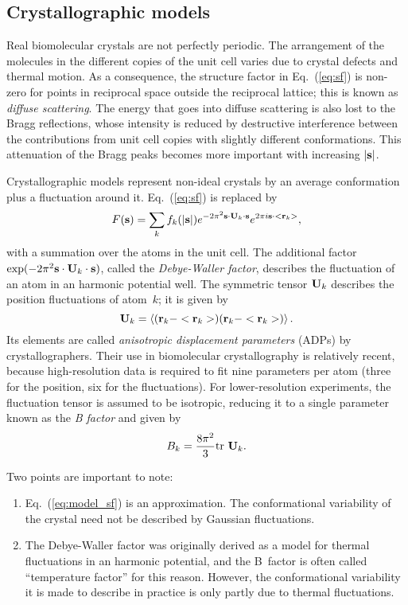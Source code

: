 \documentclass[12pt]{article}
\newcommand{\vect}[1]{{\bf #1}}
\newcommand{\mat}[1]{{\bf #1}}
\newcommand{\vr}{\vect{r}}
\newcommand{\vs}{\vect{s}}
\newcommand{\mU}{\mat{U}}
\begin{document}
\begin{sloppy}
\subsection{Crystallographic models}

Real biomolecular crystals are not perfectly periodic. The arrangement
of the molecules in the different copies of the unit cell varies due
to crystal defects and thermal motion. As a consequence, the structure
factor in Eq.~(\ref{eq:sf}) is non-zero for points in reciprocal space
outside the reciprocal lattice; this is known as \textit{diffuse
scattering}. The energy that goes into diffuse scattering is also
lost to the Bragg reflections, whose intensity is reduced by
destructive interference between the contributions from unit cell
copies with slightly different conformations. This attenuation of the
Bragg peaks becomes more important with increasing $|\vs|$.

Crystallographic models represent non-ideal crystals by an average
conformation plus a fluctuation around it. Eq.~(\ref{eq:sf}) is
replaced by
\begin{equation}
\label{eq:model_sf}
F(\vs) = \sum_k f_k(|\vs|) e^{-2\pi^2 \vs\cdot\mU_k\cdot\vs} e^{2\pi i\vs\cdot<\vr_k>},
\end{equation}
with a summation over the atoms in the unit cell.
The additional factor $\exp(-2\pi^2 \vs\cdot\mU_k\cdot\vs)$,
called the \textit{Debye-Waller factor}, describes the fluctuation
of an atom in an harmonic potential well. The symmetric tensor $\mU_k$
describes the position fluctuations of atom~$k$; it is given by
\begin{equation}
\mU_k = \left<  (\vr_k-<\vr_k>) (\vr_k-<\vr_k>) \right>.
\end{equation}
Its elements are called \textit{anisotropic displacement parameters}
(ADPs) by crystallographers. Their use in biomolecular crystallography
is relatively recent, because high-resolution data is required to fit
nine parameters per atom (three for the position, six for the
fluctuations). For lower-resolution experiments, the fluctuation tensor
is assumed to be isotropic, reducing it to a single parameter known
as the \textit{B factor} and given by
\begin{equation}
B_k = \frac{8\pi^2}{3} \mbox{tr } \mU_k.
\end{equation}

Two points are important to note:
\begin{enumerate}
\item
  Eq.~(\ref{eq:model_sf}) is an approximation. The conformational
  variability of the crystal need not be described by Gaussian
  fluctuations.
\item
  The Debye-Waller factor was originally derived as a model for
  thermal fluctuations in an harmonic potential, and the B~factor is
  often called ``temperature factor'' for this reason. However, the
  conformational variability it is made to describe in practice is
  only partly due to thermal fluctuations.
\end{enumerate}


\end{sloppy}
\end{document}
